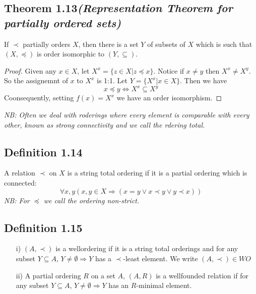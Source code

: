 \documentclass[a4paper, 12pt, twoside]{article}
\begin{document}
\subsection*{Theorem 1.13\textit{(Representation Theorem for partially ordered sets)}}
If $\prec$ partially orders $X$, then there is a set $Y$ of subsets of $X$ which is such that $(X,\preceq)$ is order isomorphic to $(Y,\subseteq)$.
\begin{proof}
    Given any $x\in X$, let $X^{x} = \{z\in X|z\preceq x\}$. Notice if $x\neq y$ then $X^{x}\neq X^{y}$. So the assignemnt of $x$ to $X^{x}$ is 1:1. Let $Y = \{X^{x}|x\in X\}$. Then we have
    $$x\preceq y \iff X^{x}\subseteq X^{y} $$
    Coonsequently, setting $f(x)=X^{x}$ we have an order isomorphism.
\end{proof}
\textit{NB: Often we deal with roderings where every element is  comparable with every other, known as \emph{strong connectivity} and we call the rdering \emph{total}.}
\subsection*{Definition 1.14}
A relation $\prec$ on $X$ is a string total ordering if it is a partial ordering which is connected:
$$\forall x,y (x,y\in X\Rightarrow (x=y\vee x\prec y\vee y\prec x)) $$
\textit{NB: For $\preceq$ we call the ordering non-strict.}
\subsection*{Definition 1.15}
\begin{itemize}
    \item[i)]$(A,\prec)$ is a wellordering if it is a string total orderings and for any subset $Y\subseteq A$, $Y\neq \emptyset\Rightarrow Y$ has a $\prec$-least element. We write $(A,\prec)\in WO$
    \item[ii)] A partial ordering $R$ on a set $A$, $(A,R)$ is a wellfounded relation if for any subset $Y\subseteq A$, $Y\neq \emptyset\Rightarrow Y$ has an $R$-minimal element.
\end{itemize}
\end{document}
